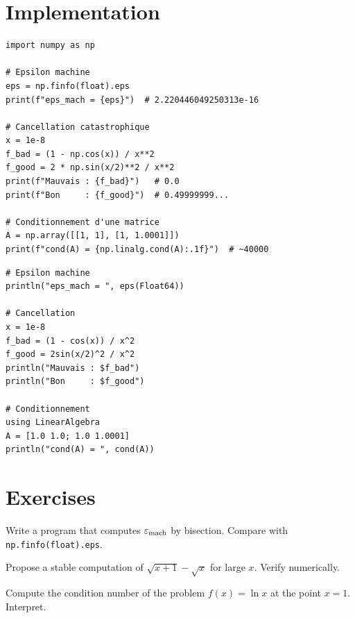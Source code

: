 \section{Implementation}

\begin{codeblock}[title=\textbf{Python}]
\begin{verbatim}
import numpy as np

# Epsilon machine
eps = np.finfo(float).eps
print(f"eps_mach = {eps}")  # 2.220446049250313e-16

# Cancellation catastrophique
x = 1e-8
f_bad = (1 - np.cos(x)) / x**2
f_good = 2 * np.sin(x/2)**2 / x**2
print(f"Mauvais : {f_bad}")   # 0.0
print(f"Bon     : {f_good}")  # 0.49999999...

# Conditionnement d'une matrice
A = np.array([[1, 1], [1, 1.0001]])
print(f"cond(A) = {np.linalg.cond(A):.1f}")  # ~40000
\end{verbatim}
\end{codeblock}

\begin{codeblock}[title=\textbf{Julia}]
\begin{verbatim}
# Epsilon machine
println("eps_mach = ", eps(Float64))

# Cancellation
x = 1e-8
f_bad = (1 - cos(x)) / x^2
f_good = 2sin(x/2)^2 / x^2
println("Mauvais : $f_bad")
println("Bon     : $f_good")

# Conditionnement
using LinearAlgebra
A = [1.0 1.0; 1.0 1.0001]
println("cond(A) = ", cond(A))
\end{verbatim}
\end{codeblock}

\section{Exercises}

\begin{exercise}
Write a program that computes $\varepsilon_{\mathrm{mach}}$ by bisection. Compare with \texttt{np.finfo(float).eps}.
\end{exercise}

\begin{exercise}
Propose a stable computation of $\sqrt{x+1}-\sqrt{x}$ for large $x$. Verify numerically.
\end{exercise}

\begin{exercise}
Compute the condition number of the problem $f(x)=\ln x$ at the point $x=1$. Interpret.
\end{exercise}

